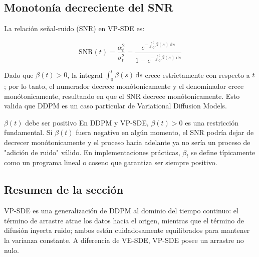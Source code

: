 \subsection{Monotonía decreciente del SNR}

La relación señal-ruido (SNR) en VP-SDE es:

$$
\mathrm{SNR}(t) = \frac{\alpha_t^2}{\sigma_t^2} = \frac{e^{-\int_0^t \beta(s)\,\mathrm{d}s}}{1 - e^{-\int_0^t \beta(s)\,\mathrm{d}s}}
$$

Dado que $\beta(t) > 0$, la integral $\int_0^t \beta(s)\,\mathrm{d}s$ crece estrictamente con respecto a $t$; por lo tanto, el numerador decrece monótonicamente y el denominador crece monótonicamente, resultando en que el SNR decrece monótonicamente. Esto valida que DDPM es un caso particular de Variational Diffusion Models.

\begin{warningbox}{$\beta(t)$ debe ser positivo}
En DDPM y VP-SDE, $\beta(t) > 0$ es una restricción fundamental. Si $\beta(t)$ fuera negativo en algún momento, el SNR podría dejar de decrecer monótonicamente y el proceso hacia adelante ya no sería un proceso de "adición de ruido" válido. En implementaciones prácticas, $\beta_t$ se define típicamente como un programa lineal o coseno que garantiza ser siempre positivo.
\end{warningbox}

\subsection{Resumen de la sección}

VP-SDE es una generalización de DDPM al dominio del tiempo continuo: el término de arrastre atrae los datos hacia el origen, mientras que el término de difusión inyecta ruido; ambos están cuidadosamente equilibrados para mantener la varianza constante. A diferencia de VE-SDE, VP-SDE posee un arrastre no nulo.
